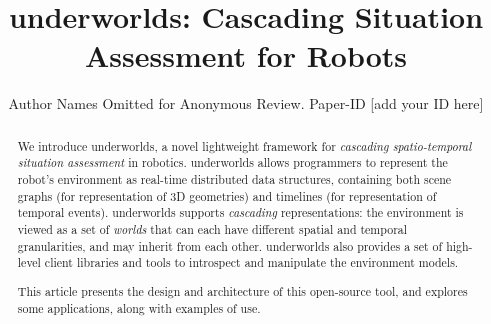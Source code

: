 \documentclass[conference]{IEEEtran}
\newcommand{\uwds}{{\sc underworlds}\xspace}
\begin{document}
\title{{\sc underworlds}: Cascading Situation Assessment for Robots
}




\author{Author Names Omitted for Anonymous Review. Paper-ID [add your ID here]}





\maketitle

\begin{abstract}

    We introduce \uwds, a novel lightweight framework for \emph{cascading
    spatio-temporal situation assessment} in robotics. \uwds allows programmers
    to represent the robot's environment as real-time distributed data
    structures, containing both scene graphs (for representation of 3D
    geometries) and timelines (for representation of temporal events). \uwds
    supports \emph{cascading} representations: the environment is viewed as a
    set of \emph{worlds} that can each have different spatial and temporal
    granularities, and may inherit from each other.  \uwds also provides a set of
    high-level client libraries and tools to introspect and manipulate the
    environment models.

    This article presents the design and architecture of this open-source tool,
    and explores some applications, along with examples of use.

\end{abstract}
\end{document}
